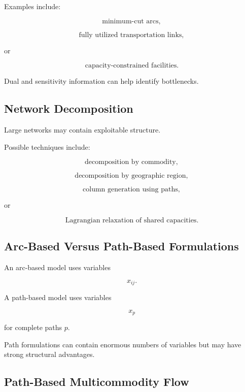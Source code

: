 Examples include:

\[
\boxed{
\text{minimum-cut arcs},
}
\]

\[
\boxed{
\text{fully utilized transportation links},
}
\]

or

\[
\boxed{
\text{capacity-constrained facilities}.
}
\]

Dual and sensitivity information can help identify bottlenecks.

\subsection{Network Decomposition}
\label{subsec:network-decomposition}

Large networks may contain exploitable structure.

Possible techniques include:

\[
\boxed{
\text{decomposition by commodity},
}
\]

\[
\boxed{
\text{decomposition by geographic region},
}
\]

\[
\boxed{
\text{column generation using paths},
}
\]

or

\[
\boxed{
\text{Lagrangian relaxation of shared capacities}.
}
\]

\subsection{Arc-Based Versus Path-Based Formulations}
\label{subsec:arc-versus-path-formulations}

An arc-based model uses variables

\[
\boxed{
x_{ij}.
}
\]

A path-based model uses variables

\[
\boxed{
x_p
}
\]

for complete paths \(p\).

Path formulations can contain enormous numbers of variables but may have
strong structural advantages.

\subsection{Path-Based Multicommodity Flow}
\label{subsec:path-based-multicommodity}

